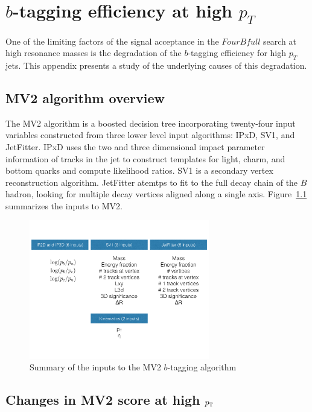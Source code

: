 \chapter{$b$-tagging efficiency at high $p_{T}$}
\label{AppendixB}

One of the limiting factors of the signal acceptance in the $FourBfull$ search at high resonance masses is the degradation of the $b$-tagging efficiency for high $p_{T}$ jets. This appendix presents a study of the underlying causes of this degradation. 

\section{MV2 algorithm overview}

The MV2 algorithm is a boosted decision tree incorporating twenty-four input variables constructed from three lower level input algorithms: IPxD, SV1, and JetFitter. IPxD uses the two and three dimensional impact parameter information of tracks in the jet to construct templates for light, charm, and bottom quarks and compute likelihood ratios. SV1 is a secondary vertex reconstruction algorithm. JetFitter atemtps to fit to the full decay chain of the $B$ hadron, looking for multiple decay vertices aligned along a single axis. Figure~\ref{fig:MV2inputs} summarizes the inputs to MV2. 

\begin{figure}[h!]
  \centering
  \captionsetup{justification=centering}

  \includegraphics[width=0.7\textwidth]{figures/MV2_inputs}
  \caption{Summary of the inputs to the MV2 $b$-tagging algorithm}
  \label{fig:MV2inputs}
\end{figure}

\section{Changes in MV2 score at high $p_{\textrm{\footnotesize\sc t}}$}

